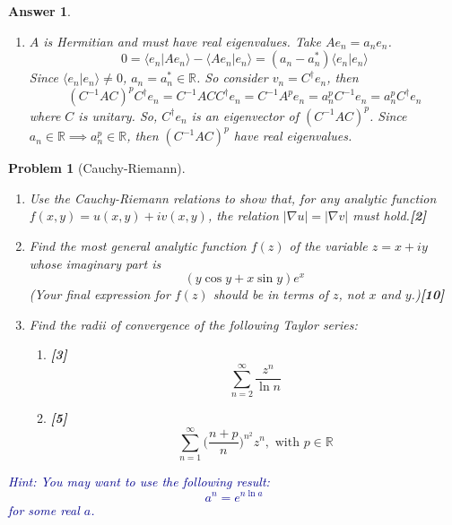 \documentclass[a4paper]{article}
\newtheorem{ans}{Answer}[section]
\theoremstyle{new}
\newtheorem{qns}{Problem}[section]
\begin{document}
\begin{ans}
\begin{enumerate}[label=(\alph*)]
\begin{enumerate}[label=(\roman*)]
\end{enumerate}
\item $A$ is Hermitian and must have real eigenvalues. Take $Ae_n=a_ne_n$. 
$$0=\langle e_n|Ae_n\rangle-\langle Ae_n|e_n\rangle=(a_n-a_n^*)\langle e_n|e_n\rangle$$
Since $\langle e_n|e_n\rangle\neq 0$, $a_n=a_n^*\in\mathbb{R}$. So consider $v_n=C^\dag e_n$, then
$$(C^{-1}AC)^pC^\dag e_n=C^{-1}ACC^\dag e_n=C^{-1}A^pe_n=a_n^pC^{-1}e_n=a_n^pC^\dag e_n$$
where $C$ is unitary. So, $C^\dag e_n$ is an eigenvector of $(C^{-1}AC)^p$. Since $a_n\in\mathbb{R}\implies a_n^p\in\mathbb{R}$, then $(C^{-1}AC)^p$ have real eigenvalues.
\end{enumerate}
\end{ans}
\newpage
\begin{qns}[Cauchy-Riemann]\leavevmode
\begin{enumerate}[label=(\alph*)]
\item Use the Cauchy-Riemann relations to show that, for any analytic function $f(x,y)=u(x,y)+iv(x,y)$, the relation $|\nabla u| = |\nabla v|$ must hold.\hfill\textbf{[2]}
\item Find the most general analytic function $f(z)$ of the variable $z = x + i y$ whose imaginary part is
$$(y\cos y + x\sin y)e^x$$
(Your final expression for $f(z)$ should be in terms of $z$, not $x$ and $y$.)\hfill\textbf{[10]}
\item Find the radii of convergence of the following Taylor series:
\begin{enumerate}[label=(\roman*)]
\item \hfill\textbf{[3]}$$\sum_{n=2}^\infty\frac{z^n}{\ln n}$$
\item  \hfill\textbf{[5]}
$$\sum_{n=1}^\infty\bigg(\frac{n+p}{n}\bigg)^{n^2}z^n,\text{ with  }p\in\mathbb{R}$$
\end{enumerate}
\end{enumerate}
\begin{mdframed}
\textcolor{darkblue}{Hint: You may want to use the following result:
$$a^n=e^{n\ln a}$$
for some real $a$.}
\end{mdframed}
\end{qns}
\end{document}

